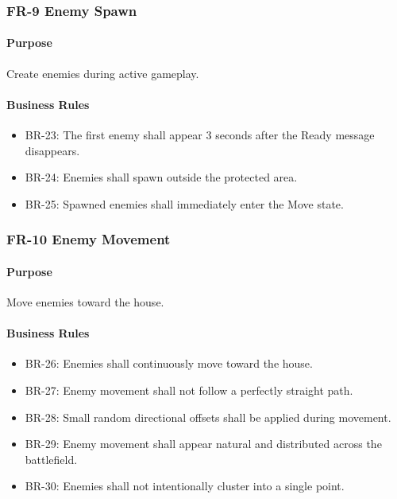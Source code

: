 \documentclass[11pt,a4paper]{article}
\begin{document}
\subsubsection{FR-9 Enemy Spawn}

\paragraph{Purpose}
Create enemies during active gameplay.

\paragraph{Business Rules}
\begin{itemize}
  \item BR-23: The first enemy shall appear 3 seconds after the Ready message
        disappears.
  \item BR-24: Enemies shall spawn outside the protected area.
  \item BR-25: Spawned enemies shall immediately enter the Move state.
\end{itemize}

\subsubsection{FR-10 Enemy Movement}

\paragraph{Purpose}
Move enemies toward the house.

\paragraph{Business Rules}
\begin{itemize}
  \item BR-26: Enemies shall continuously move toward the house.
  \item BR-27: Enemy movement shall not follow a perfectly straight path.
  \item BR-28: Small random directional offsets shall be applied during movement.
  \item BR-29: Enemy movement shall appear natural and distributed across the
        battlefield.
  \item BR-30: Enemies shall not intentionally cluster into a single point.
\end{itemize}
\end{document}
